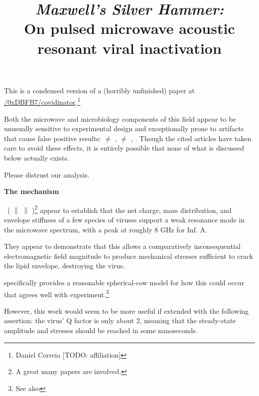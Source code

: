 \documentclass[fleqn,10pt]{paper}
\title{{\it Maxwell's Silver Hammer:}\\ On pulsed microwave acoustic resonant viral inactivation}
\begin{document}
\maketitle


This is a condensed version of a (horribly unfinished) paper at \href{https://www.github.com/0xDBFB7/covidinator/documents/paper.pdf}{\faGithub/0xDBFB7/covidinator}.\footnote{Daniel Correia [TODO: affiliation] }


%



Both the microwave and microbiology components of this field appear to be unusually sensitive to experimental design and exceptionally prone to artifacts that cause false positive results: \cite{Microwave1982} $\neq$ \cite{Resonances1987}, \cite{Effects1985a} $\neq$ \cite{Cytogenetic1986}, \cite{Comprehensive2018}. Though the cited articles have taken care to avoid these effects, it is entirely possible that none of what is discussed below actually exists.

Please distrust our analysis. 


{\Large \textbf{The mechanism}}


\cite{Microwave2009} \textrightarrow \ (\cite{focusing2014} $\parallel$ \cite{Efficient2015} $\parallel$ \cite{Resonant2017})\footnote{A great many papers are involved.} appear to establish that the net charge, mass distribution, and envelope stiffness of a few species of viruses support a weak resonance mode in the microwave spectrum, with a peak at roughly 8 GHz for Inf. A.

They appear to demonstrate that this allows a comparatively inconsequential electromagnetic field magnitude to produce mechanical stresses sufficient to crack the lipid envelope, destroying the virus.

\cite{Efficient2015} specifically provides a reasonable spherical-cow model for how this could occur that agrees well with experiment.\footnote{See also }

However, this work would seem to be more useful if extended with the following assertion: the virus' Q factor is only about 2, meaning that the steady-state amplitude and stresses should be reached in some nanoseconds.
\end{document}
